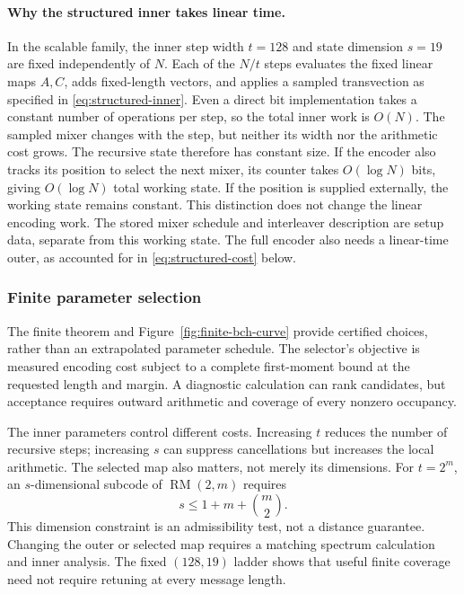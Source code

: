 \paragraph{Why the structured inner takes linear time.}
In the scalable family, the inner step width $t=128$ and state dimension
$s=19$ are fixed independently of $N$. Each of the $N/t$ steps evaluates
the fixed linear maps $A,C$, adds fixed-length vectors, and applies
a sampled transvection as specified in
\eqref{eq:structured-inner}. Even a direct bit implementation takes a
constant number of operations per step, so the total inner work is
$O(N)$. The sampled mixer changes with the step, but neither its
width nor the arithmetic cost grows. The recursive state therefore has
constant size. If the encoder also tracks its position to select the next
mixer, its counter takes $O(\log N)$ bits, giving $O(\log N)$ total
working state. If the position is supplied externally, the working state
remains constant. This distinction does not change the linear encoding
work. The stored mixer schedule and interleaver description are
setup data, separate from this working state.
The full encoder also needs a linear-time outer, as accounted for in
\eqref{eq:structured-cost} below.

\subsubsection{Finite parameter selection}
\label{sec:finite-parameter-extrapolation}

The finite theorem and Figure~\ref{fig:finite-bch-curve} provide certified
choices, rather than an extrapolated parameter schedule.
The selector's objective is measured encoding cost subject to a complete
first-moment bound at the requested length and margin.
A diagnostic calculation can rank candidates, but acceptance requires
outward arithmetic and coverage of every nonzero occupancy.

The inner parameters control different costs. Increasing $t$ reduces the
number of recursive steps; increasing $s$ can suppress cancellations but
increases the local arithmetic. The selected map also matters, not merely
its dimensions. For $t=2^m$, an $s$-dimensional subcode of
$\operatorname{RM}(2,m)$ requires
\begin{equation}
  s\le 1+m+\binom m2.
  \label{eq:rm-expansion-capacity}
\end{equation}
This dimension constraint is an admissibility test, not a distance guarantee.
Changing the outer or selected map requires a matching spectrum calculation
and inner analysis. The fixed $(128,19)$ ladder shows that useful finite
coverage need not require retuning at every message length.

